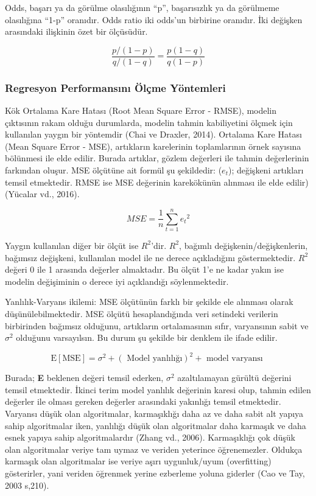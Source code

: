\documentclass[12pt,twoside]{deuthesis}
\begin{document}
Odds, başarı ya da görülme olasılığının ``p'', başarısızlık ya da görülmeme olasılığına ``1-p'' oranıdır. Odds ratio iki odds'un birbirine oranıdır. İki değişken arasındaki ilişkinin özet bir ölçüsüdür.

\[
\frac{p /(1-p)}{q /(1-q)}=\frac{p(1-q)}{q(1-p)}
\]

\hypertarget{regresyon-performansux131nux131-uxf6luxe7me-yuxf6ntemleri}{%
\subsubsection{Regresyon Performansını Ölçme Yöntemleri}\label{regresyon-performansux131nux131-uxf6luxe7me-yuxf6ntemleri}}

Kök Ortalama Kare Hatası (Root Mean Square Error - RMSE), modelin çıktısının rakam olduğu durumlarda, modelin tahmin kabiliyetini ölçmek için kullanılan yaygın bir yöntemdir (Chai ve Draxler, 2014). Ortalama Kare Hatası (Mean Square Error - MSE), artıkların karelerinin toplamlarının örnek sayısına bölünmesi ile elde edilir. Burada artıklar, gözlem değerleri ile tahmin değerlerinin farkından oluşur. MSE ölçütüne ait formül şu şekildedir: (\({e_t}\)); değişkeni artıkları temsil etmektedir. RMSE ise MSE değerinin karekökünün alınması ile elde edilir) (Yücalar vd., 2016).

\[
{MSE}=\frac{1}{n} \sum_{t=1}^{n} {e_t}^{2}
\]

Yaygın kullanılan diğer bir ölçüt ise \(R^2\)'dir. \(R^2\), bağımlı değişkenin/değişkenlerin, bağımsız değişkeni, kullanılan model ile ne derece açıkladığını göstermektedir. \(R^2\) değeri 0 ile 1 arasında değerler almaktadır. Bu ölçüt 1'e ne kadar yakın ise modelin değişiminin o derece iyi açıklandığı söylenmektedir.

Yanlılık-Varyans ikilemi: MSE ölçütünün farklı bir şekilde ele alınması olarak düşünülebilmektedir. MSE ölçütü hesaplandığında veri setindeki verilerin birbirinden bağımsız olduğunu, artıkların ortalamasının sıfır, varyansının sabit ve \(\sigma^{2}\) olduğunu varsayılsın. Bu durum şu şekilde bir denklem ile ifade edilir.

\[
\mathrm{E}[\mathrm{MSE}]=\sigma^{2}+(\text { Model yanlılığı})^{2}+\text { model varyansı }
\]

Burada; \textbf{E} beklenen değeri temsil ederken, \(\sigma^{2}\) azaltılamayan gürültü değerini temsil etmektedir. İkinci terim model yanlılık değerinin karesi olup, tahmin edilen değerler ile olması gereken değerler arasındaki yakınlığı temsil etmektedir.
Varyansı düşük olan algoritmalar, karmaşıklığı daha az ve daha sabit alt yapıya sahip algoritmalar iken, yanlılığı düşük olan algoritmalar daha karmaşık ve daha esnek yapıya sahip algoritmalardır (Zhang vd., 2006). Karmaşıklığı çok düşük olan algoritmalar veriye tam uymaz ve veriden yeterince öğrenemezler. Oldukça karmaşık olan algoritmalar ise veriye aşırı uygunluk/uyum (overfitting) gösterirler, yani veriden öğrenmek yerine ezberleme yoluna giderler (Cao ve Tay, 2003 s,210).
\end{document}
